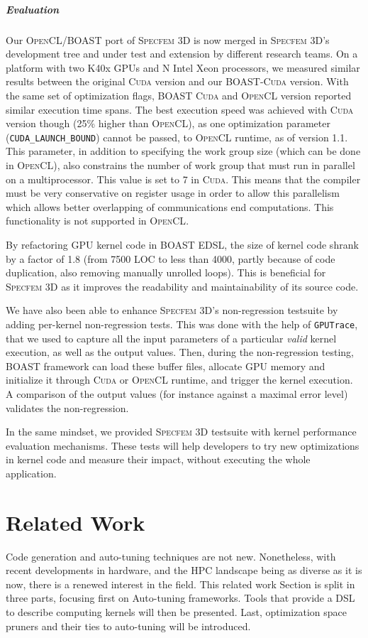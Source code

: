 \documentclass[11pt, a4paper, twoside]{montblanc}
\newcommand{\productname}[1]{\textsc{#1}}
\newcommand{\Specfem}{\productname{Specfem 3D}\xspace}
\newcommand{\Cuda}{\productname{Cuda}\xspace}
\newcommand{\OCL}{\productname{OpenCL}\xspace}
\newcommand{\code}[1]{\texttt{#1}}
\begin{document}
\subparagraph{Evaluation} Our \OCL/BOAST port of \Specfem is now
merged in \Specfem's development tree and under test and extension by
different research teams. On a platform with two K40x GPUs and N Intel
Xeon processors, we measured similar results between the original
\Cuda version and our BOAST-\Cuda version. With the same set of
optimization flags, BOAST \Cuda and \OCL version reported similar
execution time spans. The best execution speed was achieved with \Cuda
version though (25\% higher than \OCL), as one optimization parameter
(\code{CUDA\_LAUNCH\_BOUND}) cannot be passed, to \OCL runtime, as of version
1.1. This parameter, in addition to specifying the work group size (which can
be done in \OCL), also constrains the number of work group that must run in
parallel on a multiprocessor. This value is set to 7 in \Cuda. This means that
the compiler must be very conservative on register usage in order to allow this
parallelism which allows better overlapping of communications end computations.
This functionality is not supported in \OCL.

By refactoring GPU kernel code in BOAST EDSL, the size of kernel code
shrank by a factor of 1.8 (from 7500 LOC to less than 4000, partly
because of code duplication, also removing manually unrolled
loops). This is beneficial for \Specfem as it improves the readability
and maintainability of its source code.

We have also been able to enhance \Specfem's non-regression testsuite
by adding per-kernel non-regression tests. This was done with the help
of \code{GPUTrace}, that we used to capture all the input parameters
of a particular \emph{valid} kernel execution, as well as the output
values. Then, during the non-regression testing, BOAST framework can
load these buffer files, allocate GPU memory and initialize it through
\Cuda or \OCL runtime, and trigger the kernel execution. A comparison
of the output values (for instance against a maximal error level)
validates the non-regression.

In the same mindset, we provided \Specfem testsuite with kernel
performance evaluation mechanisms. These tests will help developers to
try new optimizations in kernel code and measure their impact, without
executing the whole application.

\section{Related Work}

Code generation and auto-tuning techniques are not new. Nonetheless, with recent
developments in hardware, and the HPC landscape being as diverse as it is now,
there is a renewed interest in the field. This related work Section is split in
three parts, focusing first on Auto-tuning frameworks. Tools that provide a DSL
to describe computing kernels will then be presented. Last, optimization space
pruners and their ties to auto-tuning will be introduced.
\end{document}
